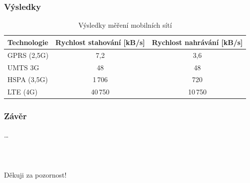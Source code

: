 \documentclass[%
  12pt,               %
  t,                  %
  aspectratio=1610,   %
  unicode,            %
czech,              %
]{beamer}              %
\begin{document}
\begin{frame}
\begin{columns}[T]
\begin{column}{0.6\textwidth}
\begin{figure}
      \end{figure}
    \end{column}
  \end{columns}                      %
\end{frame}


\begin{frame} 
  \frametitle{Výsledky}
  \vspace{1cm}
  \begin{table}[]
    \centering
    \caption{Výsledky měření mobilních sítí}
    \label{tab:tabulka}
      \begin{tabular}{lcc}
        \toprule
          Technologie  & Rychlost stahování [kB/s] & Rychlost nahrávání [kB/s] \\
        \midrule
          GPRS (2,5G)  & 7,2   & 3,6\\
          UMTS 3G     & 48     & 48\\
          HSPA (3,5G)  &  1\,706  &  720\\
          LTE (4G)     & 40\,750 & 10\,750\\
        \bottomrule                                       
      \end{tabular}
  \end{table}
\end{frame}


\begin{frame} 
  \frametitle{Závěr}
  \dots
\end{frame}


\begin{frame}[c] 
  \frametitle{\mbox{ }}
  \begin{center}
    {\Huge Děkuji za pozornost!}
  \end{center}
\end{frame}
\end{document}
